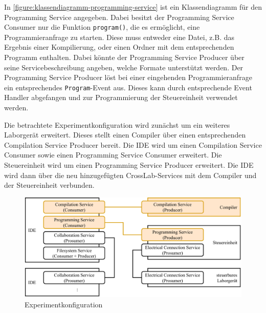 In \autoref{figure:klassendiagramm-programming-service} ist ein Klassendiagramm für den Programming Service angegeben. Dabei besitzt der Programming Service Consumer nur die Funktion \texttt{program()}, die es ermöglicht, eine Programmieranfrage zu starten. Diese muss entweder eine Datei, z.B. das Ergebnis einer Kompilierung, oder einen Ordner mit dem entsprechenden Programm enthalten. Dabei könnte der Programming Service Producer über seine Servicebeschreibung angeben, welche Formate unterstützt werden. Der Programming Service Producer löst bei einer eingehenden Programmieranfrage ein entsprechendes \texttt{Program}-Event aus. Dieses kann durch entsprechende Event Handler abgefangen und zur Programmierung der Steuereinheit verwendet werden.

Die betrachtete Experimentkonfiguration wird zunächst um ein weiteres Laborgerät erweitert. Dieses stellt einen Compiler über einen entsprechenden Compilation Service Producer bereit. Die IDE wird um einen Compilation Service Consumer sowie einen Programming Service Consumer erweitert. Die Steuereinheit wird um einen Programming Service Producer erweitert. Die IDE wird dann über die neu hinzugefügten CrossLab-Services mit dem Compiler und der Steuereinheit verbunden.

\begin{figure}[htbp]
    \centering
    \includegraphics[width=\textwidth]{diagrams/experimentkonfigurationen/Experimentkonfiguration-03.drawio.pdf}
    \caption{Experimentkonfiguration}
    \label{figure:experimentkonfiguration:kompilierung}
\end{figure}